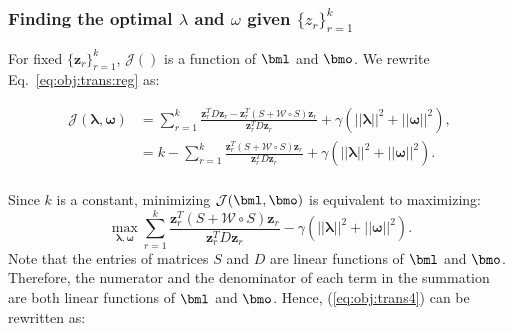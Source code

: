 \subsubsection{Finding the optimal {\boldmath $\lambda$} and {\boldmath $\omega$} given $\{${\boldmath $z$}$_r\}_{r=1}^k$}

For fixed $\{\bm z_r\}_{r=1}^k$, $\mathcal{J}()$ is a function of $\bml$ and $\bmo$.
We rewrite Eq.~\ref{eq:obj:trans:reg} as:
\begin{small}
\begin{equation}
\label{eq:obj:trans3}
\begin{split}
\mathcal{J}(\bm \lambda, \bm \omega) & = 
\sum_{r=1}^k\frac{\bm{z}_r^TD\bm{z}_r-\bm{z}_r^T(S+ \mathcal{W} \circ S)\bm{z}_r}{\bm{z}_r^TD\bm{z}_r} + \gamma(||\bm\lambda||^2+||\bm \omega||^2), \\
& = k - \sum_{r=1}^k\frac{\bm{z}_r^T(S+ \mathcal{W} \circ S)\bm{z}_r}{\bm{z}_r^TD\bm{z}_r} + \gamma(||\bm\lambda||^2+||\bm \omega||^2). \\
\end{split}
\end{equation}
\end{small}
Since $k$ is a constant, minimizing $\mathcal{J}(\bml, \bmo)$ is equivalent to maximizing:
\begin{equation}
\label{eq:obj:trans4}
\max_{\bm \lambda, \bm \omega} \sum_{r=1}^k\frac{\bm{z}_r^T(S+ \mathcal{W} \circ S)\bm{z}_r}{\bm{z}_r^TD\bm{z}_r}
- \gamma(||\bm \lambda||^2+||\bm \omega||^2).
\end{equation}
Note that the entries of matrices $S$ and $D$ are linear functions of $\bml$ and $\bmo$.
Therefore, the numerator and the denominator of each term in the summation are both linear functions of $\bml$ and $\bmo$.
Hence, (\ref{eq:obj:trans4})
can be rewritten as:

